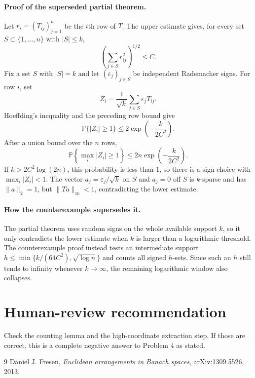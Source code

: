\documentclass[11pt]{article}
\begin{document}
\paragraph{Proof of the superseded partial theorem.}
Let $r_i=(T_{ij})_{j=1}^n$ be the $i$th row of $T$.  The upper estimate gives,
for every set $S\subset\{1,\ldots,n\}$ with $|S|\leq k$,
\[
  \left(\sum_{j\in S} r_{ij}^2\right)^{1/2}\leq C.
\]
Fix a set $S$ with $|S|=k$ and let $(\varepsilon_j)_{j\in S}$ be independent
Rademacher signs.  For row $i$, set
\[
  Z_i=\frac{1}{\sqrt k}\sum_{j\in S}\varepsilon_j T_{ij}.
\]
Hoeffding's inequality and the preceding row bound give
\[
  \mathbb P\{|Z_i|\geq 1\}\leq 2\exp\left(-\frac{k}{2C^2}\right).
\]
After a union bound over the $n$ rows,
\[
  \mathbb P\left\{\max_i |Z_i|\geq 1\right\}
  \leq 2n\exp\left(-\frac{k}{2C^2}\right).
\]
If $k>2C^2\log(2n)$, this probability is less than $1$, so there is a sign
choice with $\max_i|Z_i|<1$.  The vector
$a_j=\varepsilon_j/\sqrt k$ on $S$ and $a_j=0$ off $S$ is $k$-sparse and has
$\|a\|_2=1$, but $\|Ta\|_\infty<1$, contradicting the lower estimate.

\paragraph{How the counterexample supersedes it.}
The partial theorem uses random signs on the whole available support $k$, so
it only contradicts the lower estimate when $k$ is larger than a logarithmic
threshold.  The counterexample proof instead tests an intermediate support
$h\leq \min\{k/(64C^2),\sqrt{\log n}\}$ and counts all signed $h$-sets.  Since
such an $h$ still tends to infinity whenever $k\to\infty$, the remaining
logarithmic window also collapses.

\section*{Human-review recommendation}

Check the counting lemma and the high-coordinate extraction step.  If those
are correct, this is a complete negative answer to Problem 4 as stated.

\begin{thebibliography}{9}
Daniel J. Fresen,
\emph{Euclidean arrangements in Banach spaces},
arXiv:1309.5526, 2013.
\end{thebibliography}
\end{document}
